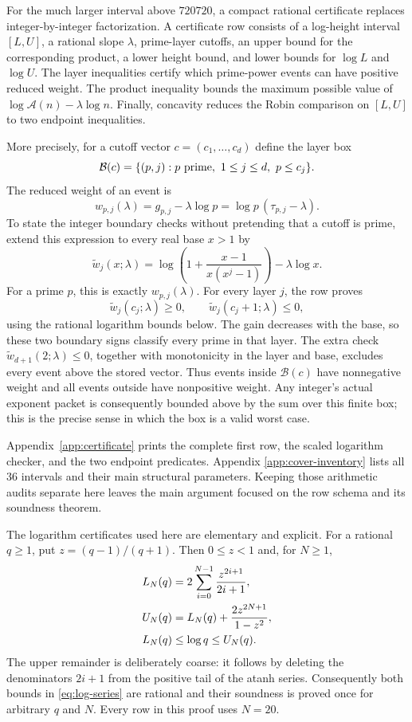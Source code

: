 \documentclass[11pt]{amsart}
\theoremstyle{definition}
\theoremstyle{remark}
\numberwithin{equation}{section}
\newcommand{\A}{\mathcal{A}}
\begin{document}
For the much larger interval above $720720$, a compact rational certificate
replaces integer-by-integer factorization.  A certificate row consists of a
log-height interval $[L,U]$, a rational slope $\lambda$, prime-layer cutoffs,
an upper bound for the corresponding product, a lower height bound, and
lower bounds for $\log L$ and $\log U$.  The layer inequalities certify which
prime-power events can have positive reduced weight.  The product inequality
bounds the maximum possible value of
$\log\A(n)-\lambda\log n$.  Finally, concavity reduces the Robin comparison
on $[L,U]$ to two endpoint inequalities.

More precisely, for a cutoff vector $c=(c_1,\ldots,c_d)$ define the layer box
\[
 \mathcal B(c)=\{(p,j):p\ \hbox{prime},\ 1\le j\le d,\ p\le c_j\}.
\]
The reduced weight of an event is
\begin{equation}\label{eq:row-reduced-weight}
 w_{p,j}(\lambda)=g_{p,j}-\lambda\log p
 =\log p\,(\tau_{p,j}-\lambda).
\end{equation}
To state the integer boundary checks without pretending that a cutoff is
prime, extend this expression to every real base $x>1$ by
\[
 \widetilde w_j(x;\lambda)=
 \log\!\left(1+\frac{x-1}{x(x^j-1)}\right)-\lambda\log x.
\]
For a prime $p$, this is exactly $w_{p,j}(\lambda)$.  For every layer $j$,
the row proves
\[
 \widetilde w_j(c_j;\lambda)\ge0,
 \qquad \widetilde w_j(c_j+1;\lambda)\le0,
\]
using the rational logarithm bounds below.  The gain decreases with the base,
so these two boundary signs classify every prime in that layer.  The extra
check $\widetilde w_{d+1}(2;\lambda)\le0$, together with monotonicity in the
layer and base, excludes every event above the stored vector.  Thus events inside
$\mathcal B(c)$ have nonnegative weight and all events outside have
nonpositive weight.  Any integer's actual exponent packet is consequently
bounded above by the sum over this finite box; this is the precise sense in
which the box is a valid worst case.

Appendix~\ref{app:certificate} prints the complete first row, the scaled
logarithm checker, and the two endpoint predicates.  Appendix
\ref{app:cover-inventory} lists all 36 intervals and their main structural
parameters.  Keeping those arithmetic audits separate here leaves the main
argument focused on the row schema and its soundness theorem.

The logarithm certificates used here are elementary and explicit.  For a
rational $q\ge1$, put $z=(q-1)/(q+1)$.  Then $0\le z<1$ and, for $N\ge1$,
\begin{align}
 L_N(q)&=2\sum_{i=0}^{N-1}\frac{z^{2i+1}}{2i+1},\notag\\
 U_N(q)&=L_N(q)+\frac{2z^{2N+1}}{1-z^2},\label{eq:log-series}\\
 L_N(q)&\le\log q\le U_N(q).\notag
\end{align}
The upper remainder is deliberately coarse: it follows by deleting the
denominators $2i+1$ from the positive tail of the atanh series.  Consequently
both bounds in \eqref{eq:log-series} are rational and their soundness is proved
once for arbitrary $q$ and $N$.  Every row in this proof uses $N=20$.
\end{document}
